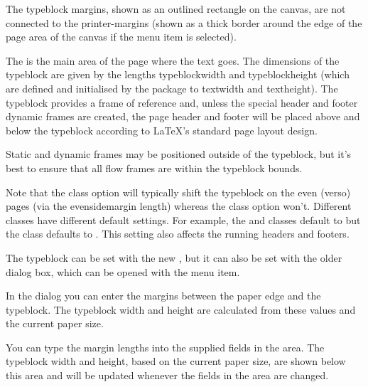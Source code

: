 \begin{information}
The \gls{typeblock} margins, shown as an outlined 
rectangle on the \gls{canvas}, are not connected to the 
\glspl{printer-margin} (shown as a thick  border around
the edge of the page area of the \gls{canvas} if the
 menu item is selected).
\end{information}

The  is the main area of the page where the
text goes.  The dimensions of the \gls{typeblock} are given by the
lengths \gls{typeblockwidth} and \gls{typeblockheight}
(which are defined and initialised by the  package to
\gls{textwidth} and \gls{textheight}). The \gls{typeblock} provides
a frame of reference and, unless the special header and footer
dynamic frames are created, the page header and footer will be
placed above and below the \gls{typeblock} according to \LaTeX's
standard page layout design.

\begin{information}
Static and dynamic frames may be positioned outside of the
\gls{typeblock}, but it's best to ensure that all flow frames are
within the \gls{typeblock} bounds.
\end{information}

Note that the  class option will typically
shift the typeblock on the even (\gls{verso}) pages (via the
\gls{evensidemargin} length) whereas the
 class option won't. Different classes have
different default settings. For example, the  and
 classes default to  but the
 class defaults to . This setting also
affects the running headers and footers.


The \gls{typeblock} can be set with the new , but it
can also be set with the older  dialog box, which can be
opened with the  menu item.


In the  dialog you can enter the margins between
the paper edge and the \gls{typeblock}.
The \gls{typeblock} width and height are calculated from these
values and the current paper size.

You can type the margin lengths into the supplied fields
in the  area. 
The \gls{typeblock} width and height, based on the current paper size,
are shown below this area and will be updated whenever the fields in
the  area are changed.

